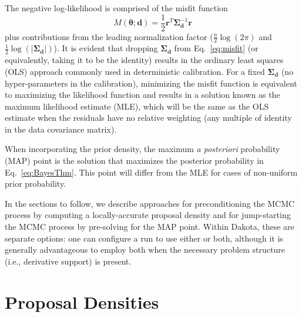 The negative log-likelihood is comprised of the misfit function
\begin{equation}
M(\boldsymbol{\theta;d}) 
  = \frac{1}{2} \boldsymbol{r}^T \boldsymbol{\Sigma}_{\boldsymbol{d}}^{-1} \boldsymbol{r}
\label{eq:misfit}
\end{equation}
plus contributions from the leading normalization factor
($\frac{n}{2}\log(2\pi)$ and $\frac{1}{2}\log(|\boldsymbol{\Sigma_d}|)$).  
It is evident that dropping $\boldsymbol{\Sigma_d}$ from
Eq.~\ref{eq:misfit} (or equivalently, taking it to be the identity)
results in the ordinary least squares (OLS) approach commonly used in
deterministic calibration.  For a fixed $\boldsymbol{\Sigma_d}$ (no
hyper-parameters in the calibration), minimizing the misfit function 
is equivalent to maximizing the likelihood function and results in a
solution known as the maximum likelihood estimate (MLE), which will be
the same as the OLS estimate when the residuals have no relative
weighting (any multiple of identity in the data covariance matrix).

When incorporating the prior density, the maximum {\it a posteriori}
probability (MAP) point is the solution that maximizes the posterior
probability in Eq.~\ref{eq:BayesThm}.  This point will differ
from the MLE for cases of non-uniform prior probability.


In the sections to follow, we describe approaches for preconditioning the
MCMC process by computing a locally-accurate proposal density 
and for jump-starting the MCMC process by pre-solving for the MAP point.
Within Dakota, these are separate options: one can configure a run to use
either or both, although it is generally advantageous to employ both
when the necessary problem structure (i.e., derivative support) is present.


\section{Proposal Densities} \label{uq:bayes:prop}

